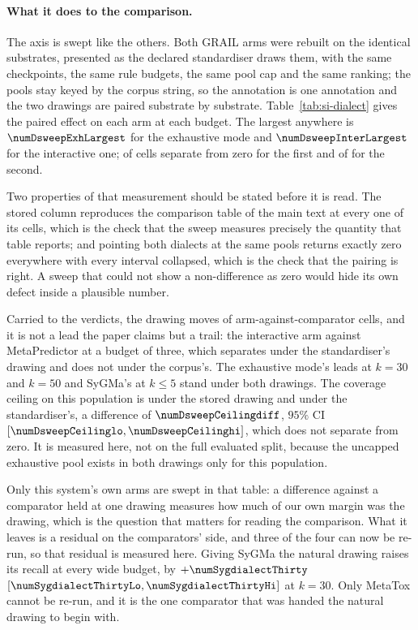 \documentclass[journal=jcisd8,manuscript=suppinfo,layout=onecolumn]{achemso}
\begin{document}
\paragraph{What it does to the comparison.} The axis is swept like the others. Both GRAIL arms
were rebuilt on the identical substrates, presented as the declared standardiser draws them, with
the same checkpoints, the same rule budgets, the same pool cap and the same ranking; the pools
stay keyed by the corpus string, so the annotation is one annotation and the two drawings are
paired substrate by substrate. Table~\ref{tab:si-dialect} gives the paired effect on each arm at
each budget. The largest anywhere is $\numDsweepExhLargest$ for the exhaustive mode and
$\numDsweepInterLargest$ for the interactive one; \numDsweepExhSeparatingWord{} of
\numDsweepExhBudgetsWord{} cells separate from zero for the first and
\numDsweepInterSeparatingWord{} of \numDsweepInterBudgetsWord{} for the second.

Two properties of that measurement should be stated before it is read. The stored column
reproduces the comparison table of the main text at every one of its cells, which is the check
that the sweep measures precisely the quantity that table reports; and pointing both
dialects at the same pools returns exactly zero everywhere with every interval collapsed, which is
the check that the pairing is right. A sweep that could not show a non-difference as zero would
hide its own defect inside a plausible number.

Carried to the verdicts, the drawing moves \numDsweepMoved{} of \numDsweepCells{}
arm-against-comparator cells, and it is not a lead the paper claims but a trail: the interactive
arm against MetaPredictor at a budget of three, which separates under the standardiser's drawing
and does not under the corpus's. The exhaustive mode's
leads at $k=30$ and $k=50$ and SyGMa's at $k \le 5$ stand under both drawings. The coverage
ceiling on this population is \numDsweepCeilingstored{} under the stored drawing and
\numDsweepCeilingdrawn{} under the standardiser's, a difference of $\numDsweepCeilingdiff$,
$95\%$ CI $[\numDsweepCeilinglo, \numDsweepCeilinghi]$, which does not separate from zero. It is
measured here, not on the full evaluated split, because the uncapped exhaustive pool exists
in both drawings only for this population.

Only this system's own arms are swept in that table: a difference against a comparator held at
one drawing measures how much of our own margin was the drawing, which is the question that
matters for reading the comparison. What it leaves is a residual on the comparators' side, and
three of the four can now be re-run, so that residual is measured here. Giving SyGMa
the natural drawing raises its recall at every wide budget, by $+\numSygdialectThirty$
$[\numSygdialectThirtyLo, \numSygdialectThirtyHi]$ at $k=30$. Only MetaTox cannot be re-run, and
it is the one comparator that was handed the natural drawing to begin with.
\end{document}
